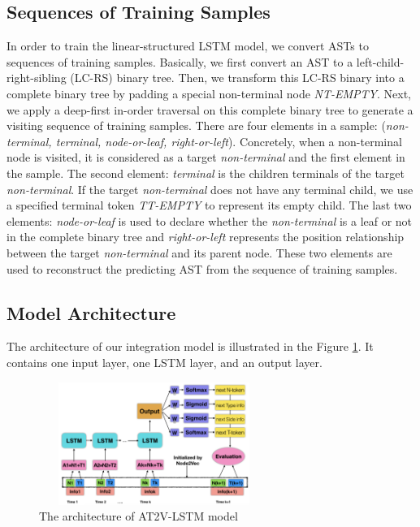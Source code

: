 \documentclass[E]{compsoft}
\begin{document}
\subsection{Sequences of Training Samples}
In order to train the linear-structured LSTM model, we convert ASTs to sequences of training samples.
Basically, we first convert an AST to a left-child-right-sibling (LC-RS) binary tree. 
Then, we transform this LC-RS binary into a complete binary tree by padding a special non-terminal node \textit{NT-EMPTY}.
Next, we apply a deep-first in-order traversal on this complete binary tree to generate a visiting sequence of training samples. 
There are four elements in a sample: (\textit{non-terminal, terminal, node-or-leaf, right-or-left}).
Concretely, when a non-terminal node is visited, it is considered as a target \textit{non-terminal} and the first element in the sample.
The second element: \textit{terminal} is the children terminals of the target \textit{non-terminal}.
If the target \textit{non-terminal} does not have any terminal child, we use a specified terminal token \textit{TT-EMPTY} to represent its empty child.
The last two elements: \textit{node-or-leaf} is used to declare whether the \textit{non-terminal} is a leaf or not in the complete binary tree and \textit{right-or-left} represents the position relationship between the target \textit{non-terminal} and its parent node. 
These two elements are used to reconstruct the predicting AST from the sequence of training samples.



\subsection{Model Architecture}
The architecture of our integration model is illustrated in the Figure \ref{fig:nti2p_model_architecture}. 
It contains one input layer, one LSTM layer, and an output layer. 


\begin{figure}[!ht]
\centering
\includegraphics[height=4cm, width=7.5cm]{pictures/lstm_structure.png}
\caption{The architecture of AT2V-LSTM model}
\label{fig:nti2p_model_architecture}
\end{figure}
\end{document}
